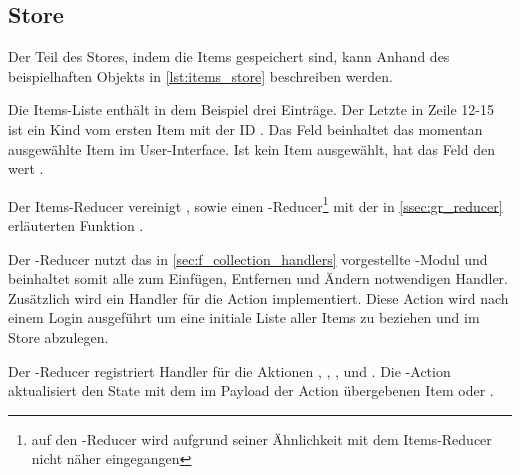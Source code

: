 \subsection{Store}
\label{ssec:fi_store}

Der Teil des Stores, indem die Items gespeichert sind, kann Anhand des
beispielhaften Objekts in \cref{lst:items_store} beschreiben werden.



Die Items-Liste enthält in dem Beispiel drei Einträge.  Der Letzte in Zeile
12-15 ist ein Kind vom ersten Item mit der ID .  Das Feld
 beinhaltet das momentan ausgewählte Item im User-Interface.
Ist kein Item ausgewählt, hat das Feld den wert .

Der Items-Reducer vereinigt ,  sowie
einen -Reducer\footnote{auf den -Reducer
wird aufgrund seiner Ähnlichkeit mit dem Items-Reducer nicht näher
eingegangen} mit der in \cref{ssec:gr_reducer} erläuterten Funktion
.

Der -Reducer nutzt das in \cref{sec:f_collection_handlers}
vorgestellte -Modul und beinhaltet somit alle zum
Einfügen, Entfernen und Ändern notwendigen Handler.  Zusätzlich wird ein
Handler für die Action  implementiert.  Diese
Action wird nach einem Login ausgeführt um eine initiale Liste aller Items
zu beziehen und im Store abzulegen.

Der -Reducer registriert Handler für die Aktionen
, ,
, und .  Die
-Action aktualisiert den State mit dem im Payload
der Action übergebenen Item oder .
